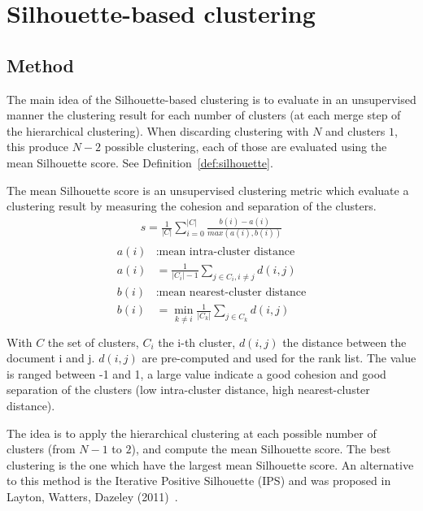\section{Silhouette-based clustering \label{sec:silhouette-based_clustering}}

\subsection{Method}

The main idea of the Silhouette-based clustering is to evaluate in an unsupervised manner the clustering result for each number of clusters (at each merge step of the hierarchical clustering).
When discarding clustering with $N$ and clusters $1$, this produce $N - 2$ possible clustering, each of those are evaluated using the mean Silhouette score.
See Definition~\ref{def:silhouette}.

\begin{definition}
  \label{def:silhouette}
  The mean Silhouette score is an unsupervised clustering metric which evaluate a clustering result by measuring the cohesion and separation of the clusters.
  \begin{gather*}
    s = \frac{1}{|C|} \sum_{i = 0}^{|C|} \frac{b(i) - a(i)}{max(a(i), b(i))}
  \end{gather*}
  \begin{gather*}
    \begin{split}
      a(i)&: \text{mean intra-cluster distance} \\
      a(i)& = \frac{1}{|C_i| - 1} \sum_{j \in C_i, i\neq j} d(i, j) \\
      b(i)&: \text{mean nearest-cluster distance} \\
      b(i)& = \min_{k\neq i} \frac{1}{|C_k|} \sum_{j \in C_k} d(i, j) \\
    \end{split}
  \end{gather*}
  With $C$ the set of clusters, $C_i$ the i-th cluster, $d(i, j)$ the distance between the document i and j.
  $d(i, j)$ are pre-computed and used for the rank list.
  The value is ranged between -1 and 1, a large value indicate a good cohesion and good separation of the clusters (low intra-cluster distance, high nearest-cluster distance).
\end{definition}

The idea is to apply the hierarchical clustering at each possible number of clusters (from $N - 1$ to $2$), and compute the mean Silhouette score.
The best clustering is the one which have the largest mean Silhouette score.
An alternative to this method is the Iterative Positive Silhouette (IPS) and was proposed in Layton, Watters, Dazeley (2011)~\cite{automated_unsupervised}.

